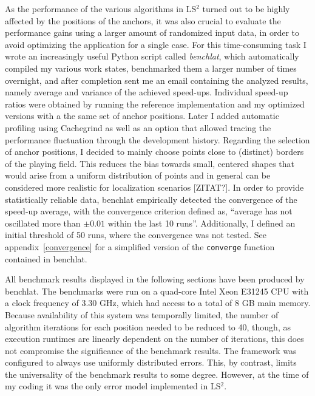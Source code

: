As the performance of the various algorithms in LS$^{2}$ turned out to be highly affected by the positions of the anchors, it was also crucial to evaluate the performance gains using a larger amount of randomized input data, in order to avoid optimizing the application for a single case. For this time-consuming task I wrote an increasingly useful Python script called \emph{benchlat}, which automatically compiled my various work states, benchmarked them a larger number of times overnight, and after completion sent me an email containing the analyzed results, namely average and variance of the achieved speed-ups. Individual speed-up ratios were obtained by running the reference implementation and my optimized versions with a the same set of anchor positions. Later I added automatic profiling using Cachegrind as well as an option that allowed tracing the performance fluctuation through the development history. Regarding the selection of anchor positions, I decided to mainly choose points close to (distinct) borders of the playing field. This reduces the bias towards small, centered shapes that would arise from a uniform distribution of points and in general can be considered more realistic for localization scenarios [ZITAT?]. In order to provide statistically reliable data, benchlat empirically detected the convergence of the speed-up average, with the convergence criterion defined as, ``average has not oscillated more than $\pm0.01$ within the last 10 runs''. Additionally, I defined an initial threshold of 50 runs, where the convergence was not tested. See appendix~\ref{convergence} for a simplified version of the \texttt{converge} function contained in benchlat.

All benchmark results displayed in the following sections have been produced by benchlat. The benchmarks were run on a quad-core Intel Xeon E31245 CPU with a clock frequency of 3.30 GHz, which had access to a total of 8 GB main memory. Because availability of this system was temporally limited, the number of algorithm iterations for each position needed to be reduced to 40, though, as execution runtimes are linearly dependent on the number of iterations, this does not compromise the significance of the benchmark results. The framework was configured to always use uniformly distributed errors. This, by contrast, limits the universality of the benchmark results to some degree. However, at the time of my coding it was the only error model implemented in LS$^{2}$.


